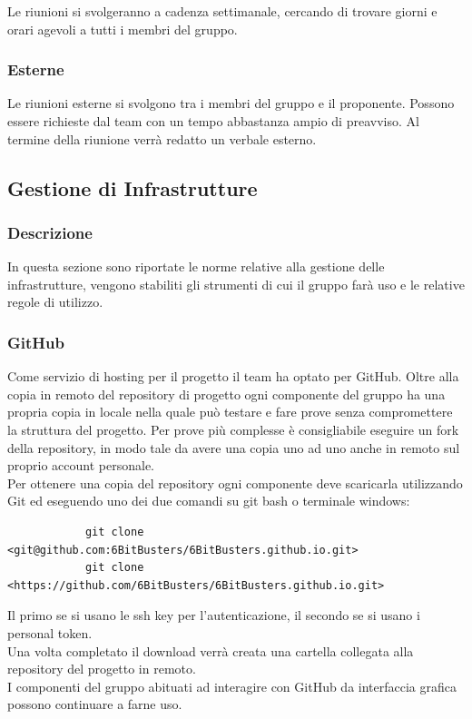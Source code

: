         Le riunioni si svolgeranno a cadenza settimanale, cercando di trovare giorni e orari agevoli a tutti i
        membri del gruppo.

        \subsubsection{Esterne}
        Le riunioni esterne si svolgono tra i membri del gruppo e il proponente. Possono essere richieste
        dal team con un tempo abbastanza ampio di preavviso. Al termine della riunione verrà redatto un verbale esterno.

    \subsection{Gestione di Infrastrutture}
        \subsubsection{Descrizione}
        In questa sezione sono riportate le norme relative alla gestione delle infrastrutture, vengono stabiliti gli
        strumenti di cui il gruppo farà uso e le relative regole di utilizzo.

        \subsubsection{GitHub}
        Come servizio di hosting per il progetto il team ha optato per GitHub. 
        Oltre alla copia in remoto del repository di progetto ogni componente del gruppo ha una propria
        copia in locale nella quale può testare e fare prove senza compromettere la struttura del progetto.
        Per prove più complesse è consigliabile eseguire un fork della repository, in modo tale da avere una copia uno ad uno anche in 
        remoto sul proprio account personale.\\
        Per ottenere una copia del repository ogni componente deve scaricarla utilizzando Git ed eseguendo uno dei due comandi 
        su git bash o terminale windows:
        \begin{verbatim}
            git clone <git@github.com:6BitBusters/6BitBusters.github.io.git>
            git clone <https://github.com/6BitBusters/6BitBusters.github.io.git>
        \end{verbatim}
        Il primo se si usano le ssh key per l'autenticazione, il secondo se si usano i personal token.\\
        Una volta completato il download verrà creata una cartella collegata alla repository del progetto in remoto.\\
        I componenti del gruppo abituati ad interagire con GitHub da interfaccia grafica possono continuare a
        farne uso.
        
